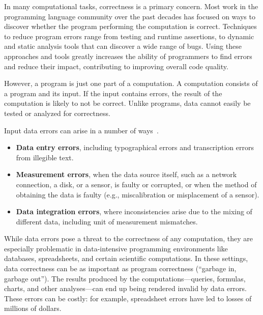 In many computational tasks, correctness is a primary concern. Most
work in the programming language community over the past decades has
focused on ways to discover whether the program performing the
computation is correct. Techniques to reduce program errors range from
testing and runtime assertions, to dynamic and static analysis tools
that can discover a wide range of bugs. Using these approaches and
tools greatly increases the ability of programmers to find errors and
reduce their impact, contributing to improving overall code quality.


However, a program is just one part of a computation. A computation
consists of a program and its input. If the input contains errors, the
result of the computation is likely to not be correct. Unlike
programs, data cannot easily be tested or analyzed for correctness.

Input data
errors can arise in a number of ways~\cite{hellerstein2008quantitative}.

\begin{itemize}

\item {\bf Data entry errors}, including typographical errors and transcription errors from illegible text.

\item {\bf Measurement errors}, when the data source itself, such as a network connection, a disk, or a sensor, is faulty or corrupted, or when the method of obtaining the data is faulty (e.g., miscalibration or misplacement of a sensor).

\item {\bf Data integration errors}, where inconsistencies arise due to the mixing of different data, including unit of measurement mismatches.

\end{itemize}


While data errors pose a threat to the correctness of any computation,
they are especially problematic in data-intensive programming
environments like databases, spreadsheets, and certain scientific
computations. In these
settings, data correctness can be as important as program correctness
(``garbage in, garbage out''). The results produced by the
computations---queries, formulas, charts, and other analyses---can end
up being rendered invalid by data errors. These errors can be costly:
for example, spreadsheet errors have led to losses of millions of
dollars. %

